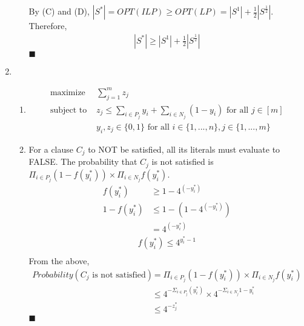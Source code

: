 \documentclass{article}
\begin{document}
\begin{enumerate}
\begin{enumerate}
        By (C) and (D), $|S^*| = OPT(ILP) \geq OPT(LP) = |S^1| + \frac{1}{2}|S^{\frac{1}{2}}|$. Therefore,
        \begin{align*}
            |S^*| \geq |S^1| + \frac{1}{2}|S^{\frac{1}{2}}|
        \end{align*}
        \hfill $\blacksquare$
    \end{enumerate} 
    \newpage
    
    \item 
    \begin{enumerate}
        \item \begin{align*}
            \text{maximize } & \sum_{j=1}^{m} z_j\\
            \text{subject to } & z_j \leq \sum_{i \in P_j} y_i + \sum_{i \in N_j} (1 - y_i) \text{ for all } j \in [m]\\
            & y_i, z_j \in \{0, 1\} \text{ for all } i \in \{1, ..., n\}, j \in \{1, ..., m\}
        \end{align*}
        
        \item For a clause $C_j$ to NOT be satisfied, all its literals must evaluate to FALSE. The probability that $C_j$ is not satisfied is $\Pi_{i \in P_j} (1 - f(y_i^*)) \times \Pi_{i \in N_j} f(y_i^*)$.
        \begin{align*}
            f(y^*_i) & \geq 1 - 4^{(-y^*_i)} \tag{from definition of $f(y)$} \\
            1 - f(y^*_i) &\leq 1 - (1 - 4^{(-y^*_i)})\\
            &= 4^{(-y^*_i)}
        \end{align*}
        \begin{align*}
            f(y^*_i) \leq 4^{y^*_i - 1} \tag{from definition of $f(y)$}\\
        \end{align*}
        From the above,
        \begin{align*}
            Probability(C_j \text{ is not satisfied}) &= \Pi_{i \in P_j} (1 - f(y_i^*)) \times \Pi_{i \in N_j} f(y_i^*) \\
            &\leq 4^{-\Sigma_{i \in P_j}(y^*_i)} \times 4^{-\Sigma_{i \in N_j}1 - y^*_i}\\
            &\leq 4^{-z_j^*} \tag{by constraint in LP in (a)}
        \end{align*}
        \hfill $\blacksquare$
        

\end{enumerate}
\end{enumerate}
\end{document}

